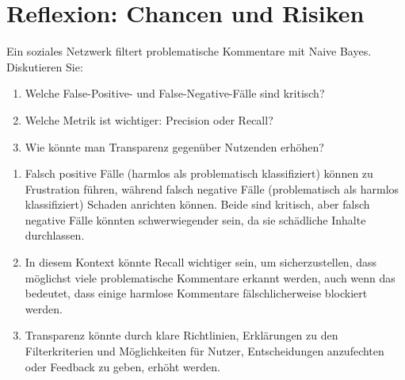 \section{Reflexion: Chancen und Risiken}

\begin{mychallenge}
Ein soziales Netzwerk filtert problematische Kommentare mit Naive Bayes.
Diskutieren Sie:
\begin{enumerate}
    \item Welche False-Positive- und False-Negative-Fälle sind kritisch?
    \item Welche Metrik ist wichtiger: Precision oder Recall?
    \item Wie könnte man Transparenz gegenüber Nutzenden erhöhen?
\end{enumerate}

\begin{myanswer}
    \begin{enumerate}
        \item Falsch positive Fälle (harmlos als problematisch klassifiziert) können zu Frustration führen, während falsch negative Fälle (problematisch als harmlos klassifiziert) Schaden anrichten können. Beide sind kritisch, aber falsch negative Fälle könnten schwerwiegender sein, da sie schädliche Inhalte durchlassen.
        \item In diesem Kontext könnte Recall wichtiger sein, um sicherzustellen, dass möglichst viele problematische Kommentare erkannt werden, auch wenn das bedeutet, dass einige harmlose Kommentare fälschlicherweise blockiert werden.
        \item Transparenz könnte durch klare Richtlinien, Erklärungen zu den Filterkriterien und Möglichkeiten für Nutzer, Entscheidungen anzufechten oder Feedback zu geben, erhöht werden.
    \end{enumerate}
\end{myanswer}
\end{mychallenge}
